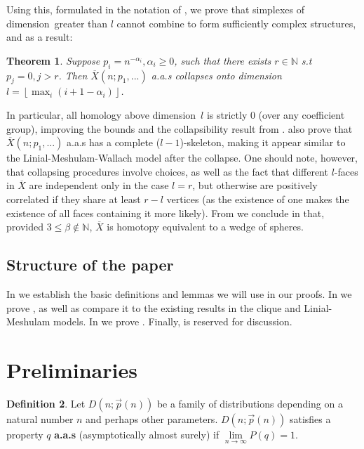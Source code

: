 \documentclass{article}
\newcommand{\floor}[1]{\left\lfloor #1 \right\rfloor}
\theoremstyle{plain}
\newtheorem{theorem}{Theorem}[section]
\theoremstyle{definition}
\newtheorem{definition}[theorem]{Definition}
\theoremstyle{remark}
\newcommand{\N}{\mathbb{N}}
\newcommand{\di}{dimension}
\begin{document}
Using this, formulated in the notation of , we prove that simplexes of \di \ greater than $l$ cannot combine to form sufficiently complex structures, and as a result:
\begin{theorem}\label{thm:uppercollapse}
    Suppose $p_i=n^{-\alpha_i},\alpha_i\ge0$, such that there exists $r\in \N$ s.t $p_j=0,j>r$. Then $\overline{X}(n;p_1,...)$ a.a.s collapses onto \di \ $l=\floor{\max_i(i+1-\alpha_i)}$.
\end{theorem}
 In particular, all homology above \di\ $l$ is strictly $0$ (over any coefficient group), improving the bounds and the collapsibility result from .
 \cite{FarberNowik23} also prove that $\overline{X} (n;p_1,...)$ a.a.s has a complete ($l-1$)-skeleton, making it appear similar to the Linial-Meshulam-Wallach model after the collapse.
 One should note, however, that collapsing procedures involve choices, as well as the fact that different $l$-faces in $\overline{X}$ are independent only in the case $l=r$, but otherwise are positively correlated if they share at least $r-l$ vertices (as the existence of one makes the existence of all faces containing it more likely).
 From  we conclude in  that, provided $3\le \beta\not \in\N$, $\overline{X}$ is homotopy equivalent to a wedge of spheres.
\subsection{Structure of the paper}
In  we establish the basic definitions and lemmas we will use in our proofs. In  we prove , as well as compare it to the existing results in the clique and Linial-Meshulam models.
In  we prove .
Finally,  is reserved for discussion.


\section{Preliminaries}\label{prelim}

\begin{definition}\label{aas}    
 Let $D(n;\vec{p}(n))$ be a family of distributions depending on a natural number $n$ and perhaps other parameters. $D(n;\vec{p}(n))$ satisfies a property $q$ \textbf{a.a.s} (asymptotically almost surely) if $\underset{n\to \infty}{\lim} P(q)=1$.
 \end{definition}
\end{document}
